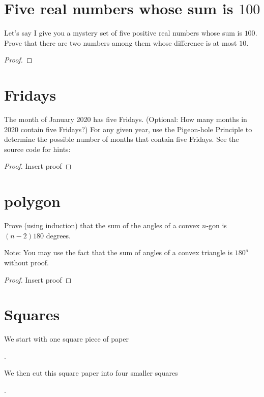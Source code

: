 \documentclass[10pt]{amsart}
\begin{document}
\section{Five real numbers whose sum is $100$} 
Let's say I give you a mystery set of five positive real numbers whose sum is $100$. Prove that there are two numbers among them whose difference is at most $10$.

\begin{proof}
\end{proof}

\section{Fridays}\label{sec:fridays} 
The month of January 2020 has five Fridays. (Optional: How many months in 2020 contain five Fridays?) For any given year, use the Pigeon-hole Principle to determine the possible number of months that contain five Fridays.
See the source code for hints: 
\begin{proof}
Insert proof
\end{proof}




\section{polygon}
Prove (using induction) that the sum of the angles of a convex $n$-gon is $(n-2)180$ degrees.

Note: You may use the fact that the sum of angles of a convex triangle is $180^o$ without proof.
\begin{proof}
	Insert proof
\end{proof}


\section{Squares}
We start with one square piece of paper 
.

We then cut this square paper into four smaller squares
.
\end{document}
